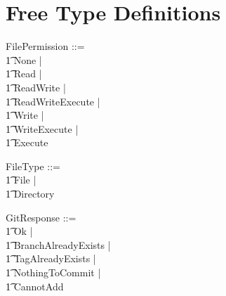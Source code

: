 \section{Free Type Definitions}

\begin{zed}
  FilePermission ::= \\
  \t1 None | \\
  \t1 Read | \\
  \t1 ReadWrite | \\
  \t1 ReadWriteExecute | \\
  \t1 Write | \\
  \t1 WriteExecute | \\
  \t1 Execute
\end{zed}

\begin{zed}
  FileType ::= \\
  \t1 File | \\
  \t1 Directory
\end{zed}

\begin{zed}
  GitResponse ::= \\
  \t1 Ok | \\
  \t1 BranchAlreadyExists | \\
  \t1 TagAlreadyExists | \\
  \t1 NothingToCommit | \\
  \t1 CannotAdd
\end{zed}


